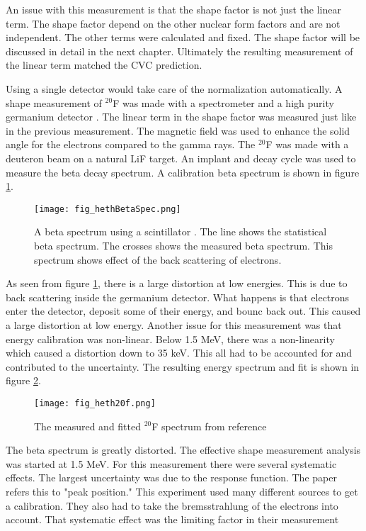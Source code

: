 \documentclass[../MaxHughesThesis.tex]{subfiles}
\begin{document}
An issue with this measurement is that the shape factor is not just the linear term.
The shape factor depend on the other nuclear form factors and are not independent.
The other terms were calculated and fixed.
The shape factor will be discussed in detail in the next chapter.
Ultimately the resulting measurement of the linear term matched the CVC prediction.

Using a single detector would take care of the normalization automatically. 
A shape measurement of $^{20}$F was made with a spectrometer and a high purity germanium detector \cite{Het89}.
The linear term in the shape factor was measured just like in the previous measurement.
The magnetic field was used to enhance the solid angle for the electrons compared to the gamma rays.
The $^{20}$F was made with a deuteron beam on a natural LiF target. 
An implant and decay cycle was used to measure the beta decay spectrum. 
A calibration beta spectrum is shown in figure \ref{fig:hethspec}.

\begin{figure}[!htb]
	\centerline{\texttt{[image: fig\_hethBetaSpec.png]}}
	\caption{A beta spectrum using a scintillator \cite{Het89}.
		    The line shows the statistical beta spectrum.
		    The crosses shows the measured beta spectrum.
		    This spectrum shows effect of the back scattering of electrons.}
	\label{fig:hethspec}
\end{figure}

As seen from figure \ref{fig:hethspec}, there is a large distortion at low energies.
This is due to back scattering inside the germanium detector.
What happens is that electrons enter the detector, deposit some of their energy, and bounc back out.
This caused a large distortion at low energy.
Another issue for this measurement was that energy calibration was non-linear.
Below 1.5 MeV, there was a non-linearity which caused a distortion down to 35 keV. 
This all had to be accounted for and contributed to the uncertainty.
The resulting energy spectrum and fit is shown in figure \ref{fig:heth20Fspec}.

\begin{figure}[!htb]
	\centerline{\texttt{[image: fig\_heth20f.png]}}
	\caption{The measured and fitted $^{20}$F spectrum from reference \cite{Het89}}
	\label{fig:heth20Fspec}
\end{figure}

The beta spectrum is greatly distorted.
The effective shape measurement analysis was started at 1.5 MeV.
For this measurement there were several systematic effects.
The largest uncertainty was due to the response function.
The paper refers this to "peak position." 
This experiment used many different sources to get a calibration.
They also had to take the bremsstrahlung of the electrons into account.
That systematic effect was the limiting factor in their measurement
\end{document}
